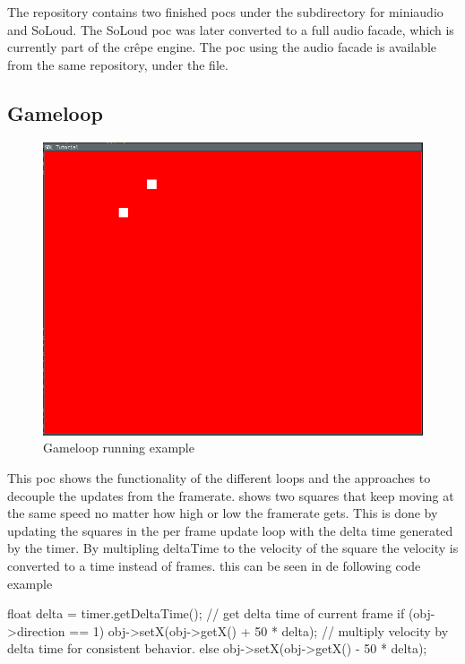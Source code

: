 \documentclass{projdoc}
\begin{document}
The repository \autocite{crepe:code-repo} contains two finished \glspl{poc} under the
 subdirectory for miniaudio and SoLoud. The SoLoud \gls{poc}
was later converted to a full audio \gls{facade}, which is currently part of the
cr\^epe engine. The \gls{poc} using the audio \gls{facade} is available from the same
repository, under the  file.

\subsection{Gameloop}
\label{poc:gameloop}

\begin{figure}
	\centering
	\includegraphics[scale=0.4]{img/gameloop-squares.png}
	\caption{Gameloop running example}
	\label{fig:poc-gameloop-squares}
\end{figure}

This \gls{poc} shows the functionality of the different loops and the approaches to
decouple the updates from the framerate.  shows two
squares that keep moving at the same speed no matter how high or low the framerate
gets. This is done by updating the squares in the per frame update loop with the
delta time generated by the timer. By multipling deltaTime to the velocity of the
square the velocity is converted to a time instead of frames. this can be seen in de
following code example\noparbreak
\begin{blockcode}
float delta = timer.getDeltaTime(); // get delta time of current frame
	if (obj->direction == 1) {
		obj->setX(obj->getX() + 50 * delta); // multiply velocity by delta time for consistent behavior.
	} else {
		obj->setX(obj->getX() - 50 * delta);
	}
\end{blockcode}
\end{document}
